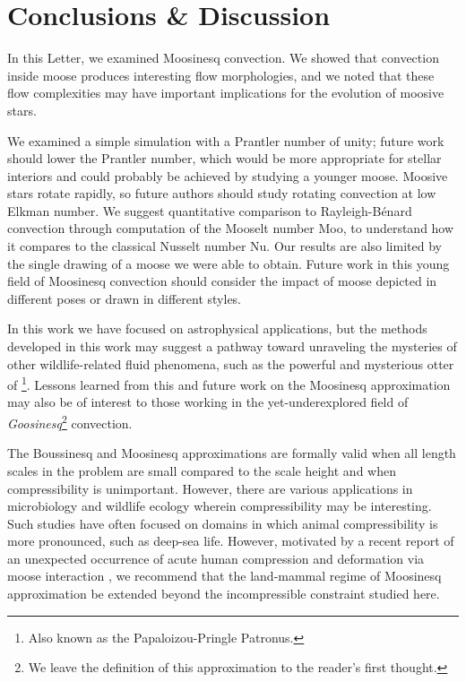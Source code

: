 \section{Conclusions \& Discussion}
\label{sec:conclusions}

In this Letter, we examined Moosinesq convection.
We showed that convection inside moose produces interesting flow morphologies, and we noted that these flow complexities may have important implications for the evolution of moosive stars.

We examined a simple simulation with a Prantler number of unity; future work should lower the Prantler number, which would be more appropriate for stellar interiors \citep{garaud_2021} and could probably be achieved by studying a younger moose.
Moosive stars rotate rapidly, so future authors should study rotating convection at low Elkman number.
We suggest quantitative comparison to Rayleigh-B\'{e}nard convection through computation of the Mooselt number Moo, to understand how it compares to the classical Nusselt number Nu.
Our results are also limited by the single drawing of a moose we were able to obtain.
Future work in this young field of Moosinesq convection should consider the impact of moose depicted in different poses or drawn in different styles.

In this work we have focused on astrophysical applications, but the methods developed in this work may suggest a pathway toward unraveling the mysteries of other wildlife-related fluid phenomena, such as the powerful and mysterious otter of \cite{Schwab2021}\footnote{Also known as the Papaloizou-Pringle Patronus.}.
Lessons learned from this and future work on the Moosinesq approximation may also be of interest to those working in the yet-underexplored field of \textit{Goosinesq}\footnote{We leave the definition of this approximation to the reader's first thought.} convection.

The Boussinesq and Moosinesq approximations are formally valid when all length scales in the problem are small compared to the scale height and when compressibility is unimportant.
However, there are various applications in microbiology \citep[e.g.][]{Ravetto2014} and wildlife ecology \citep[e.g.][]{Enright1963} wherein compressibility may be interesting.
Such studies have often focused on domains in which animal compressibility is more pronounced, such as deep-sea life.
However, motivated by a recent report of an unexpected occurrence of acute human compression and deformation via moose interaction \citep{Gudmannsson2018}, we recommend that the land-mammal regime of Moosinesq approximation be extended beyond the incompressible constraint studied here.



